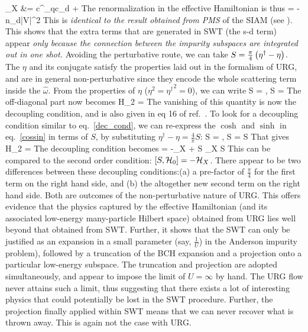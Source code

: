 \documentclass[14pt]{extarticle}
\numberwithin{equation}{section}
\begin{document}
\ham_X &= c^\dagger_{q\beta}c_{d\beta} +  
\eeq
The renormalization in the effective Hamiltonian is thus
\beq
\hf {} = -\hat n_{d\beta}|V|^2
\eeq
This is \textit{identical to the result obtained from PMS} of the SIAM (see \cite{hewson}). This shows that the extra terms that are generated in SWT (the s-d term) appear \textit{only because the connection between the impurity subspaces are integrated out in one shot.}
\pb Avoiding the perturbative route, we can take \(S = \frac{\pi}{4}\left({\eta^\dagger - \eta}\right)\). The \(\eta\) and its conjugate satisfy the properties laid out in the formalism of URG, and are in general non-perturbative since they encode the whole scattering term inside the \(\hat \omega\). From the properties of \(\eta\) (\(\eta^2 = {\eta^\dagger}^2 = 0\)), we can write
\beq[cossin]
\cosh S = , \sinh S = \rr{\eta^\dagger - \eta}
\eeq
The off-diagonal part now becomes
\beq
H_2 = \hf{}
\eeq
The vanishing of this quantity is now the decoupling condition, and is also given in eq 16 of ref.~\cite{holography1}.
\pb To look for a decoupling condition similar to eq.~\ref{dec_cond}, we can re-express the \(\cosh\) and \(\sinh\) in eq.~\ref{cossin} in terms of \(S\), by substituting \(\eta^\dagger - \eta = \frac{4}{\pi}S\):
\beq
\cosh S = , \sinh S = S
\eeq
That gives
\beq
H_2 = \hf{}
\eeq
The decoupling condition becomes
\beq
{} = -\ham_X + S \ham_X S
\eeq
This can be compared to the second order condition: \(\left[{S,\mathcal{H}_0}\right] = -\mathcal{H}_X\).
\pb There appear to be two differences between these decoupling conditions:(a)  a pre-factor of \(\frac{\pi}{4}\) for the first term on the right hand side, and (b) the altogether new second term on the right hand side. Both are outcomes of the non-perturbative nature of URG. This offers evidence that the physics captured by the effective Hamiltonian (and its associated low-energy many-particle Hilbert space) obtained from URG lies well beyond that obtained from SWT. Further, it shows that the SWT can only be justified as an expansion in a small parameter (say, $\frac{1}{U}$) in the Anderson impurity problem), followed by a truncation of the BCH expansion and a projection onto a particular low-energy subspace. The truncation and projection are adopted simultaneously, and appear to impose the limit of \(U = \infty\) by hand. The URG flow never attains such a limit, thus suggesting that there exists a lot of interesting physics that could potentially be lost in the SWT procedure. Further, the projection finally applied within SWT means that we can never recover what is thrown away. This is again not the case with URG.



\end{document}
